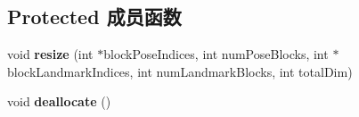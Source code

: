 \subsection*{Protected 成员函数}
\begin{DoxyCompactItemize}
\item 
\hypertarget{classg2o_1_1BlockSolver_a0075af2df18364cf99fd80f813b8ce4b}{void {\bfseries resize} (int $\ast$block\-Pose\-Indices, int num\-Pose\-Blocks, int $\ast$block\-Landmark\-Indices, int num\-Landmark\-Blocks, int total\-Dim)}\label{classg2o_1_1BlockSolver_a0075af2df18364cf99fd80f813b8ce4b}

\item 
\hypertarget{classg2o_1_1BlockSolver_a1877467844b7b9ab51bd6600e3a93eb0}{void {\bfseries deallocate} ()}\label{classg2o_1_1BlockSolver_a1877467844b7b9ab51bd6600e3a93eb0}

\end{DoxyCompactItemize}
